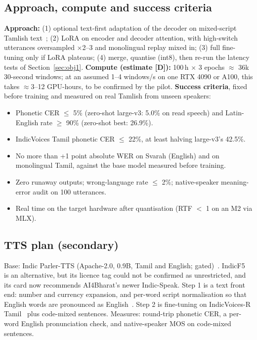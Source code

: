 \documentclass[conference]{IEEEtran}
\begin{document}
\subsection{Approach, compute and success criteria}
\textbf{Approach:} (1) optional text-first adaptation of the decoder on mixed-script Tamlish text~\cite{asyncswitch2025}; (2) LoRA on encoder and decoder attention, with high-switch utterances oversampled $\times$2--3 and monolingual replay mixed in; (3) full fine-tuning only if LoRA plateaus; (4) merge, quantise (int8), then re-run the latency tests of Section~\ref{sec:obj1}.
\textbf{Compute (estimate [D]):} 100\,h $\times$ 3 epochs $\approx$ 36k 30-second windows; at an assumed 1--4 windows/s on one RTX 4090 or A100, this takes $\approx$3--12 GPU-hours, to be confirmed by the pilot.
\textbf{Success criteria}, fixed before training and measured on real Tamlish from unseen speakers:
\begin{itemize}
\item Phonetic CER $\le$ 5\% (zero-shot large-v3: 5.0\% on read speech) and Latin-English rate $\ge$ 90\% (zero-shot best: 26.9\%).
\item IndicVoices Tamil phonetic CER $\le$ 22\%, at least halving large-v3's 42.5\%.
\item No more than +1 point absolute WER on Svarah (English) and on monolingual Tamil, against the base model measured before training.
\item Zero runaway outputs; wrong-language rate $\le$ 2\%; native-speaker meaning-error audit on 100 utterances.
\item Real time on the target hardware after quantisation (RTF $<$ 1 on an M2 via MLX).
\end{itemize}

\subsection{TTS plan (secondary)}
Base: Indic Parler-TTS (Apache-2.0, 0.9B, Tamil and English; gated)~\cite{mc_indicparler,lyth2024parler}. IndicF5~\cite{mc_indicf5,chen2024f5} is an alternative, but its licence tag could not be confirmed as unrestricted, and its card now recommends AI4Bharat's newer Indic-Speak. Step 1 is a text front end: number and currency expansion, and per-word script normalisation so that English words are pronounced as English~\cite{gh_hinglishtts}. Step 2 is fine-tuning on IndicVoices-R Tamil~\cite{sankar2024indicvoicesr} plus code-mixed sentences. Measures: round-trip phonetic CER, a per-word English pronunciation check, and native-speaker MOS on code-mixed sentences.
\end{document}
